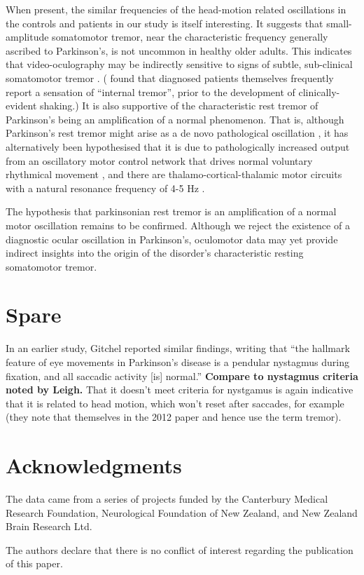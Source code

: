 \documentclass[jou,a4paper]{apa6}
\begin{document}
When present, the similar frequencies of the head-motion related oscillations in the controls and patients in our study is itself interesting. It suggests that small-amplitude somatomotor tremor, near the characteristic frequency generally ascribed to Parkinson's, is not uncommon in healthy older adults. This indicates that video-oculography may be indirectly sensitive to signs of subtle, sub-clinical somatomotor tremor \citep{MacAskill2013Ocular-tremor-i}.  (\citet{Shulman1996Internal-tremor} found that diagnosed patients themselves frequently report a sensation of ``internal tremor'', prior to the development of clinically-evident shaking.)  It is also supportive of the characteristic rest tremor of Parkinson's being an amplification of a normal phenomenon. That is, although Parkinson's rest tremor might arise as a de novo pathological oscillation \citep{McAuley2000Physiological-a}, it has alternatively been hypothesised that it is due to pathologically increased output from an oscillatory motor control network that drives normal voluntary rhythmical movement \citep{Burkhard2002Voluntarily-sim,Schnitzler2005Normal-and-path,Schnitzler2006Physiological-a}, and there are thalamo-cortical-thalamic motor circuits with a natural resonance frequency of 4-5 Hz \citep{Volkmann1996Central-motor-l}.

The hypothesis that parkinsonian rest tremor is an amplification of a normal motor oscillation remains to be confirmed. Although we reject the existence of a diagnostic ocular oscillation in Parkinson's, oculomotor data may yet provide indirect insights into the origin of the disorder's characteristic resting somatomotor tremor.

\section{Spare}
In an earlier study, Gitchel \citeyearpar{Gitchel2009Oculomotor-cont} reported similar findings, writing that ``the hallmark feature of eye movements in Parkinson's disease is a pendular nystagmus during fixation, and all saccadic activity [is] normal.'' \textbf{Compare to nystagmus criteria noted by Leigh.} That it doesn't meet criteria for nystgamus is again indicative that it is related to head motion, which won't reset after saccades, for example (they note that themselves in the 2012 paper and hence use the term tremor). 


\section{Acknowledgments}
The data came from a series of projects funded by the Canterbury Medical Research Foundation, Neurological Foundation of New Zealand, and New Zealand Brain Research Ltd.

The authors declare that there is no conflict of interest regarding the
publication of this paper.


\end{document}

